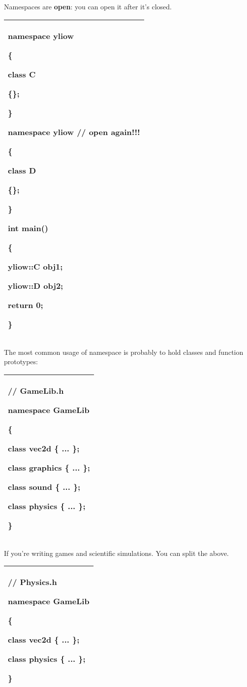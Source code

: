 \documentclass[
]{article}
\begin{document}
Namespaces are \textbf{open}: you can open it after it's closed.

\begin{longtable}[]{@{}l@{}}
\toprule
\endhead
\begin{minipage}[t]{0.97\columnwidth}\raggedright
namespace yliow

\{

class C

\{\};

\}

namespace yliow // open again!!!

\{

class D

\{\};

\}

int main()

\{

yliow::C obj1;

yliow::D obj2;

return 0;

\}\strut
\end{minipage}\tabularnewline
\bottomrule
\end{longtable}

The most common usage of namespace is probably to hold classes and
function prototypes:

\begin{longtable}[]{@{}l@{}}
\toprule
\endhead
\begin{minipage}[t]{0.97\columnwidth}\raggedright
// GameLib.h

namespace GameLib

\{

class vec2d \{ ... \};

class graphics \{ ... \};

class sound \{ ... \};

class physics \{ ... \};

\}\strut
\end{minipage}\tabularnewline
\bottomrule
\end{longtable}

If you're writing games and scientific simulations. You can split the
above.

\begin{longtable}[]{@{}l@{}}
\toprule
\endhead
\begin{minipage}[t]{0.97\columnwidth}\raggedright
// Physics.h

namespace GameLib

\{

class vec2d \{ ... \};

class physics \{ ... \};

\}\strut
\end{minipage}\tabularnewline
\bottomrule
\end{longtable}
\end{document}
